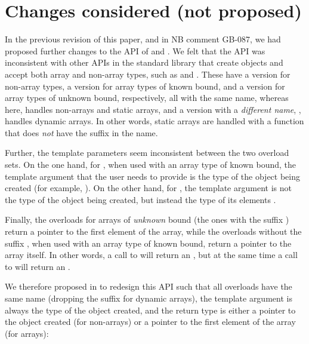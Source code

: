 \section{Changes considered (not proposed)}

In the previous revision \cite{P2679R0} of this paper, and in NB comment GB-087, we had proposed further changes to the API of \mbox{} and \mbox{}. We felt that the API was inconsistent with other APIs in the standard library that create objects and accept both array and non-array types, such as  and . These have a version for non-array types, a version for array types of known bound, and a version for array types of unknown bound, respectively, all with the same name, whereas here, \mbox{} handles non-arrays and static arrays, and a version with a \emph{different name}, \mbox{}, handles dynamic arrays. In other words, static arrays are handled with a function that does \emph{not} have the  suffix in the name.

Further, the template parameters seem inconsistent between the two overload sets. On the one hand, for \mbox{}, when used with an array type  of known bound, the template argument that the user needs to provide is the type  of the object being created (for example, ). On the other hand, for \mbox{}, the template argument is not the type  of the object being created, but instead the type of its elements .

Finally, the overloads for arrays of \emph{unknown} bound (the ones with the suffix ) return a pointer to the first element of the array, while the overloads without the suffix , when used with an array type of known bound, return a pointer to the array itself. In other words, a call to  will return an , but at the same time a call to  will return an .

We therefore proposed in \cite{P2679R0} to redesign this API such that all overloads have the same name \mbox{} (dropping the  suffix for dynamic arrays), the template argument is always the type of the object created, and the return type is either a pointer to the object created (for non-arrays) or a pointer to the first element of the array (for arrays):

